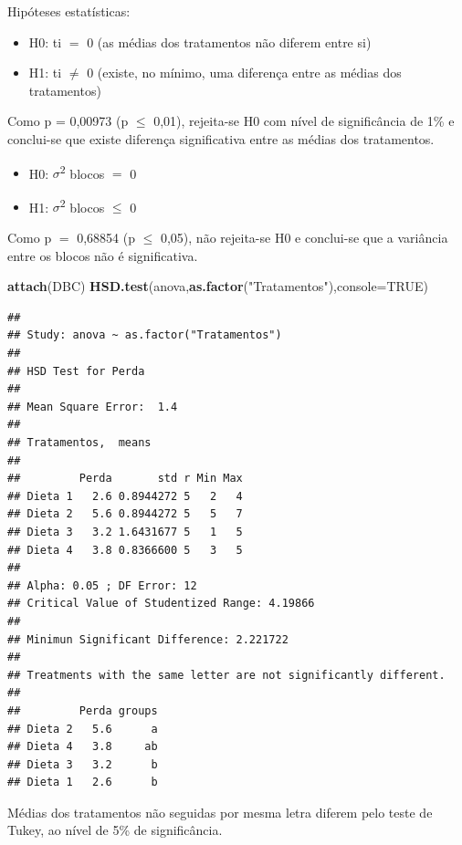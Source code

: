 \documentclass[12pt,brazil,]{book}
\newenvironment{Shaded}{\begin{snugshade}}{\end{snugshade}}
\newcommand{\DataTypeTok}[1]{\textcolor[rgb]{0.13,0.29,0.53}{#1}}
\newcommand{\KeywordTok}[1]{\textcolor[rgb]{0.13,0.29,0.53}{\textbf{#1}}}
\newcommand{\NormalTok}[1]{#1}
\newcommand{\OtherTok}[1]{\textcolor[rgb]{0.56,0.35,0.01}{#1}}
\newcommand{\StringTok}[1]{\textcolor[rgb]{0.31,0.60,0.02}{#1}}
\providecommand{\tightlist}{%
  \setlength{\itemsep}{0pt}\setlength{\parskip}{0pt}}
\begin{document}
Hipóteses estatísticas:

\begin{itemize}
\tightlist
\item
  H0: ti \(=\) 0 (as médias dos tratamentos não diferem entre si)
\item
  H1: ti \(\neq\) 0 (existe, no mínimo, uma diferença entre as médias
  dos tratamentos)
\end{itemize}

Como p = 0,00973 (p \(\leq\) 0,01), rejeita-se H0 com nível de
significância de 1\% e conclui-se que existe diferença significativa
entre as médias dos tratamentos.

\begin{itemize}
\tightlist
\item
  H0: \(\sigma\)\textsuperscript{2} blocos \(=\) 0
\item
  H1: \(\sigma\)\textsuperscript{2} blocos \(\leq\) 0
\end{itemize}

Como p \(=\) 0,68854 (p \(\leq\) 0,05), não rejeita-se H0 e conclui-se
que a variância entre os blocos não é significativa.

\begin{Shaded}
\begin{Highlighting}[]
\KeywordTok{attach}\NormalTok{(DBC)}
\KeywordTok{HSD.test}\NormalTok{(anova,}\KeywordTok{as.factor}\NormalTok{(}\StringTok{"Tratamentos"}\NormalTok{),}\DataTypeTok{console=}\OtherTok{TRUE}\NormalTok{)}
\end{Highlighting}
\end{Shaded}

\begin{verbatim}
## 
## Study: anova ~ as.factor("Tratamentos")
## 
## HSD Test for Perda 
## 
## Mean Square Error:  1.4 
## 
## Tratamentos,  means
## 
##         Perda       std r Min Max
## Dieta 1   2.6 0.8944272 5   2   4
## Dieta 2   5.6 0.8944272 5   5   7
## Dieta 3   3.2 1.6431677 5   1   5
## Dieta 4   3.8 0.8366600 5   3   5
## 
## Alpha: 0.05 ; DF Error: 12 
## Critical Value of Studentized Range: 4.19866 
## 
## Minimun Significant Difference: 2.221722 
## 
## Treatments with the same letter are not significantly different.
## 
##         Perda groups
## Dieta 2   5.6      a
## Dieta 4   3.8     ab
## Dieta 3   3.2      b
## Dieta 1   2.6      b
\end{verbatim}

Médias dos tratamentos não seguidas por mesma letra diferem pelo teste
de Tukey, ao nível de 5\% de significância.
\end{document}
